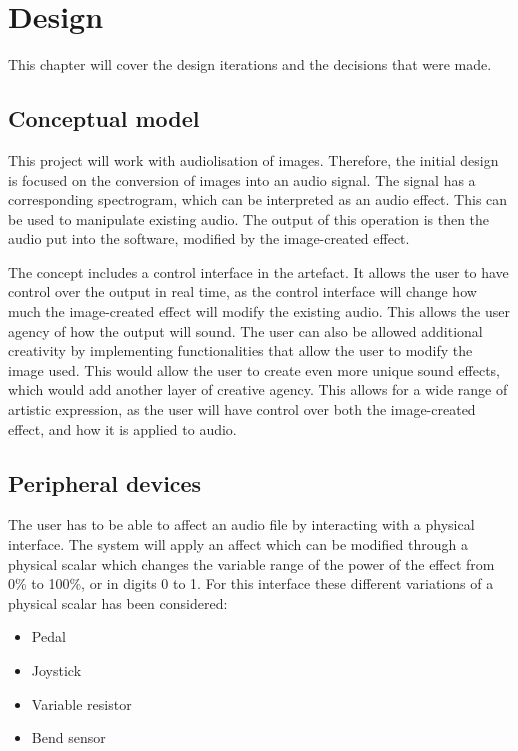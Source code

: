 \chapter{Design}\label{ch:design}
This chapter will cover the design iterations and the decisions that were made. 

\section{Conceptual model}
This project will work with audiolisation of images. Therefore, the initial design is focused on the conversion of images into an audio signal. The signal has a corresponding spectrogram, which can be interpreted as an audio effect. This can be used to manipulate existing audio. The output of this operation is then the audio put into the software, modified by the image-created effect.

The concept includes a control interface in the artefact. It allows the user to have control over the output in real time, as the control interface will change how much the image-created effect will modify the existing audio. This allows the user agency of how the output will sound. The user can also be allowed additional creativity by implementing functionalities that allow the user to modify the image used. This would allow the user to create even more unique sound effects, which would add another layer of creative agency. This allows for a wide range of artistic expression, as the user will have control over both the image-created effect, and how it is applied to audio.

\section{Peripheral devices}
The user has to be able to affect an audio file by interacting with a physical interface. The system will apply an affect which can be modified through a physical scalar which changes the variable range of the power of the effect from 0\% to 100\%, or in digits 0 to 1. For this interface these different variations of a physical scalar has been considered: 

\begin{itemize}
\item Pedal
\item Joystick
\item Variable resistor
\item Bend sensor
\end{itemize}

